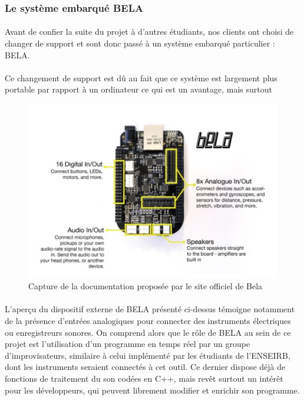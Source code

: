 \subsubsection{Le système embarqué BELA}
\paragraph{}
Avant de confier la suite du projet à d'autres étudiants, nos clients
ont choisi de changer de support et sont donc passé à un système
embarqué particulier : BELA.

\paragraph{}
Ce changement de support est dû au fait que ce système est largement plus
portable par rapport à un ordinateur ce qui est un avantage, mais surtout

\begin{figure}[h]
 \centering
 \includegraphics[scale=0.2]{bela.png}
 \caption{Capture de la documentation proposée par le site officiel de Bela}
 \label{bela}
\end{figure}

\paragraph{}
L'aperçu du dispositif externe de BELA présenté ci-dessus témoigne
notamment de la présence d'entrées analogiques pour connecter des
instruments électriques ou enregistreurs sonores. On comprend alors
que le rôle de BELA au sein de ce projet est l'utilisation d'un
programme en temps réel par un groupe d'improvisateurs,
similaire à celui implémenté par les étudiants de l'ENSEIRB, dont les
instruments seraient connectés à cet outil. Ce dernier dispose déjà de
fonctions de traitement du son codées en C++, mais revêt surtout un intérêt
pour les développeurs, qui peuvent librement modifier et enrichir son
programme.
